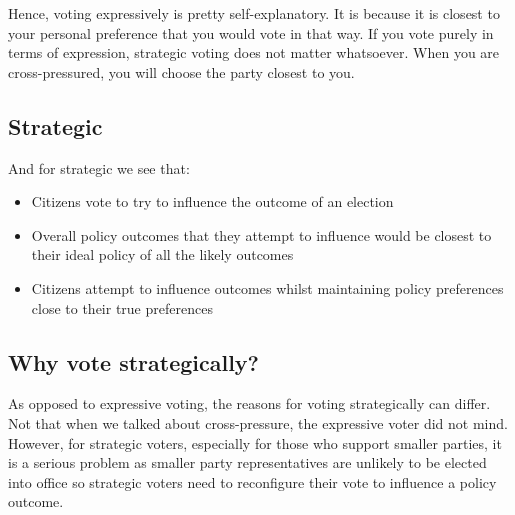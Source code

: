 \documentclass[12pt, letterpaper]{article}
\begin{document}
Hence, voting expressively is pretty self-explanatory. It is because it is closest to your personal preference that you would vote in that way. If you vote purely in terms of expression, strategic voting does not matter whatsoever. When you are cross-pressured, you will choose the party closest to you.

\subsection{Strategic}
And for strategic we see that:
\begin{itemize}
	\item Citizens vote to try to influence the outcome of an election
	\item Overall policy outcomes that they attempt to influence would be closest to their ideal policy of all the likely outcomes
	\item Citizens attempt to influence outcomes whilst maintaining policy preferences close to their true preferences
\end{itemize}

\subsection{Why vote strategically?}
As opposed to expressive voting, the reasons for voting strategically can differ. Not that when we talked about cross-pressure, the expressive voter did not mind. However, for strategic voters, especially for those who support smaller parties, it is a serious problem as smaller party representatives are unlikely to be elected into office so strategic voters need to reconfigure their vote to influence a policy outcome.
\end{document}

